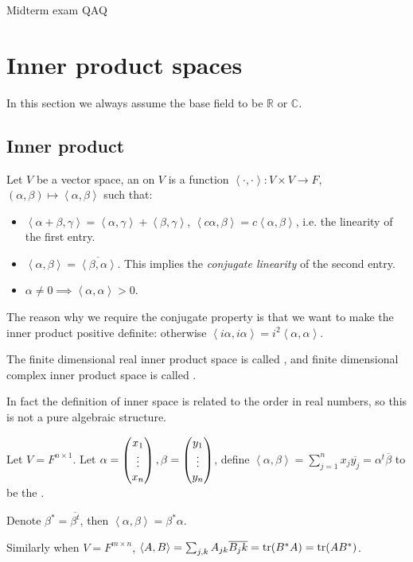 Midterm exam QAQ
\section{Inner product spaces}
\label{sec:Inner product spaces}
In this section we always assume the base field
to be $\mathbb{R}$ or $\mathbb{C}$.

\subsection{Inner product}
\label{sub:Inner product}


\begin{definition}
	Let $V$ be a vector space, an  on $V$ is
	a function $\left<\cdot, \cdot\right>: V\times V\to F$,
	$(\alpha, \beta)\mapsto \left<\alpha, \beta \right>$ such that:
	\begin{itemize}
		\item $\left<\alpha+\beta, \gamma \right>
			= \left<\alpha, \gamma \right> + \left<\beta, \gamma \right>$,
			$\left<c\alpha, \beta \right> = c\left< \alpha, \beta \right>$,
			i.e. the linearity of the first entry.
		\item $ \left<\alpha, \beta \right>
			= \overline{\left<\beta, \alpha\right>}$.
			This implies the \textit{conjugate linearity} of the second entry.
		\item $\alpha \ne 0\implies \left<\alpha, \alpha \right> > 0$.
	\end{itemize}
\end{definition}
\begin{remark}
    The reason why we require the conjugate property is that we want
	to make the inner product positive definite:
	otherwise $ \left<i\alpha, i\alpha \right> = i^2 \left<\alpha, \alpha\right>$.
\end{remark}

The finite dimensional real inner product space is called ,
and finite dimensional complex inner product space
is called .

In fact the definition of inner space is related to the order in real numbers,
so this is not a pure algebraic structure.

\begin{example}
    Let $V = F^{n\times 1}$. Let $\alpha = \begin{pmatrix} x_1\\ \vdots\\x_n \end{pmatrix},
	\beta = \begin{pmatrix} y_1\\ \vdots\\y_n \end{pmatrix}$,
	define $ \left<\alpha,\beta\right> = \sum_{j=1}^{n} x_j\overline{y_j}
	= \alpha^t \overline{\beta}$ to be the .

	Denote $\beta^* = \overline{\beta^t}$,
	then $\left<\alpha, \beta \right> = \beta^* \alpha$.

	Similarly when $V = F^{m\times n}$, $ \left<A, B \right> =
	\sum_{j,k} A_{jk}\overline{B_jk} = \operatorname{tr}(B^* A) = \operatorname{tr}(A B^*)$.
\end{example}


